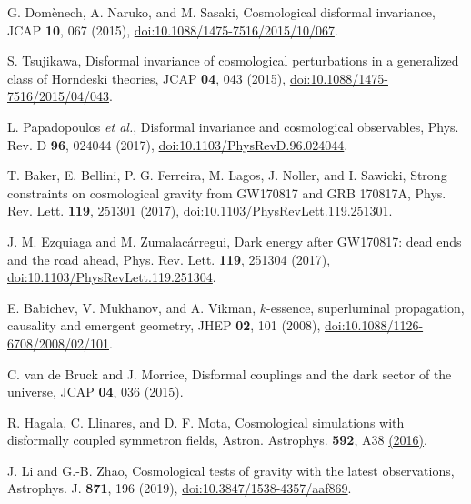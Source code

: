 \documentclass{article}
\begin{document}
\begin{thebibliography}{99}
G. Domènech, A. Naruko, and M. Sasaki, Cosmological disformal invariance, 
JCAP \textbf{10}, 067 (2015),
\href{https://doi.org/10.1088/1475-7516/2015/10/067}{doi:10.1088/1475-7516/2015/10/067}.

S. Tsujikawa, Disformal invariance of cosmological perturbations in a generalized class of Horndeski theories, 
JCAP \textbf{04}, 043 (2015),
\href{https://doi.org/10.1088/1475-7516/2015/04/043}{doi:10.1088/1475-7516/2015/04/043}.

L. Papadopoulos \emph{et al.}, Disformal invariance and cosmological observables, 
Phys. Rev. D \textbf{96}, 024044 (2017),
\href{https://doi.org/10.1103/PhysRevD.96.024044}{doi:10.1103/PhysRevD.96.024044}.

T. Baker, E. Bellini, P. G. Ferreira, M. Lagos, J. Noller, and I. Sawicki, Strong constraints on cosmological gravity from GW170817 and GRB 170817A, 
Phys. Rev. Lett. \textbf{119}, 251301 (2017),
\href{https://doi.org/10.1103/PhysRevLett.119.251301}{doi:10.1103/PhysRevLett.119.251301}.

J. M. Ezquiaga and M. Zumalacárregui, Dark energy after GW170817: dead ends and the road ahead, 
Phys. Rev. Lett. \textbf{119}, 251304 (2017),
\href{https://doi.org/10.1103/PhysRevLett.119.251304}{doi:10.1103/PhysRevLett.119.251304}.

E. Babichev, V. Mukhanov, and A. Vikman, $k$-essence, superluminal propagation, causality and emergent geometry, 
JHEP \textbf{02}, 101 (2008),
\href{https://doi.org/10.1088/1126-6708/2008/02/101}{doi:10.1088/1126-6708/2008/02/101}.

C. van de Bruck and J. Morrice, Disformal couplings and the dark sector of the universe, 
JCAP \textbf{04}, 036 
\href{https://iopscience.iop.org/article/10.1088/1475-7516/2015/04/036}{(2015)}.

R. Hagala, C. Llinares, and D. F. Mota, Cosmological simulations with disformally coupled symmetron fields, 
Astron. Astrophys. \textbf{592}, A38 
\href{https://www.aanda.org/articles/aa/full_html/2016/01/aa26439-15/aa26439-15.html}{(2016)}.

J. Li and G.-B. Zhao,
Cosmological tests of gravity with the latest observations,
Astrophys. J. \textbf{871}, 196 (2019),
\href{https://doi.org/10.3847/1538-4357/aaf869}{doi:10.3847/1538-4357/aaf869}.


\end{thebibliography}
\end{document}
